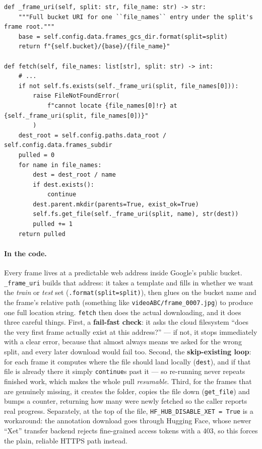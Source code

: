 \documentclass[11pt,a4paper]{article}
\newcommand{\code}[1]{\texttt{#1}}
\newcommand{\srcfile}[1]{\smallskip\noindent{\footnotesize\color{navy}\ttfamily\textbf{#1}}\par\nobreak\vspace{-0.15em}}
\begin{document}
\srcfile{src/acquire.py}
\begin{lstlisting}[style=py]
def _frame_uri(self, split: str, file_name: str) -> str:
    """Full bucket URI for one ``file_names`` entry under the split's frame root."""
    base = self.config.data.frames_gcs_dir.format(split=split)
    return f"{self.bucket}/{base}/{file_name}"

def fetch(self, file_names: list[str], split: str) -> int:
    # ...
    if not self.fs.exists(self._frame_uri(split, file_names[0])):
        raise FileNotFoundError(
            f"cannot locate {file_names[0]!r} at {self._frame_uri(split, file_names[0])}"
        )
    dest_root = self.config.paths.data_root / self.config.data.frames_subdir
    pulled = 0
    for name in file_names:
        dest = dest_root / name
        if dest.exists():
            continue
        dest.parent.mkdir(parents=True, exist_ok=True)
        self.fs.get_file(self._frame_uri(split, name), str(dest))
        pulled += 1
    return pulled
\end{lstlisting}

\paragraph{In the code.}
Every frame lives at a predictable web address inside Google's public bucket. \code{\_frame\_uri} builds
that address: it takes a template and fills in whether we want the \emph{train} or \emph{test} set
(\code{.format(split=split)}), then glues on the bucket name and the frame's relative path (something like
\code{videoABC/frame\_0007.jpg}) to produce one full location string. \code{fetch} then does the actual
downloading, and it does three careful things. First, a \textbf{fail-fast check}: it asks the cloud
filesystem ``does the very first frame actually exist at this address?'' --- if not, it stops immediately
with a clear error, because that almost always means we asked for the wrong split, and every later download
would fail too. Second, the \textbf{skip-existing loop}: for each frame it computes where the file should
land locally (\code{dest}), and if that file is already there it simply \code{continue}s past it --- so
re-running never repeats finished work, which makes the whole pull \emph{resumable}. Third, for the frames
that are genuinely missing, it creates the folder, copies the file down (\code{get\_file}) and bumps a
counter, returning how many were newly fetched so the caller reports real progress. Separately, at the top
of the file, \code{HF\_HUB\_DISABLE\_XET = True} is a workaround: the annotation download goes through
Hugging Face, whose newer ``Xet'' transfer backend rejects fine-grained access tokens with a 403, so this
forces the plain, reliable HTTPS path instead.
\end{document}
